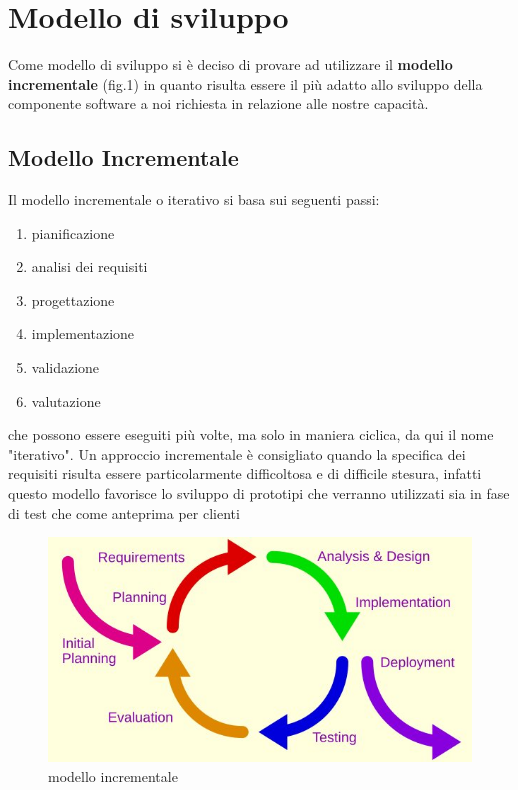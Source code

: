 \section{Modello di sviluppo}
	Come modello di sviluppo si è deciso di provare ad utilizzare il \textbf{modello incrementale} (fig.1) in quanto risulta essere il più adatto allo sviluppo della componente software a noi richiesta in relazione alle nostre capacità. 
	
	\subsection{Modello Incrementale}
		Il modello incrementale o iterativo si basa sui seguenti passi:
		\begin{enumerate}
			\item pianificazione
			\item analisi dei requisiti
			\item progettazione
			\item implementazione
			\item validazione
			\item valutazione
		\end{enumerate}
		che possono essere eseguiti più volte, ma solo in maniera ciclica, da qui il nome "iterativo". Un approccio incrementale è consigliato quando la specifica dei requisiti risulta essere particolarmente difficoltosa e di difficile stesura, infatti questo modello favorisce lo sviluppo di prototipi che verranno utilizzati sia in fase di test che come anteprima per clienti

		\begin{figure}
			\centering
		    \includegraphics{Iterative_development_model.jpg}
			\caption{modello incrementale}\label{fig:1}
		\end{figure}